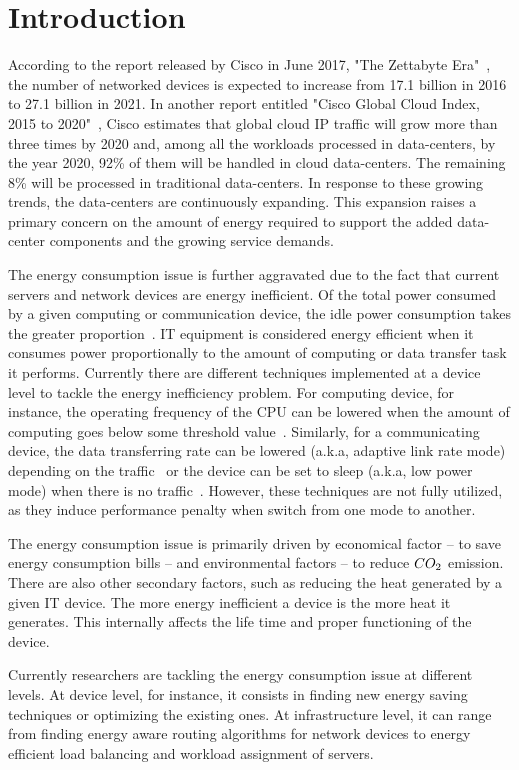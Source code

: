 \section{Introduction}
\label{section:intro}
According to the report released by Cisco in June 2017, "The Zettabyte Era"~\cite{zetta}, the number of networked devices is expected to increase from 17.1 billion in 2016 to 27.1 billion in 2021. In another report entitled "Cisco Global Cloud Index, 2015 to 2020"~\cite{gci}, Cisco estimates that global cloud IP traffic will grow more than three times by 2020 and, among all the workloads processed in data-centers, by the year 2020, 92\% of them will be handled in cloud data-centers. The remaining 8\% will be processed in traditional data-centers. In response to these growing trends, the data-centers are continuously expanding. This expansion raises a primary concern on the amount of energy required to support the added data-center components and the growing service demands. 

The energy consumption issue is further aggravated due to the fact that current servers and network devices are energy inefficient. Of the total power consumed by a given computing or communication device, the idle power consumption takes the greater proportion~\cite{survey}. IT equipment is considered energy efficient when it consumes power proportionally to the amount of computing or data transfer task it performs. Currently there are different techniques implemented at a device level to tackle the energy inefficiency problem. For computing device, for instance, the operating frequency of the CPU can be lowered when the amount of computing goes below some threshold value~\cite{dvs}. Similarly, for a communicating device, the data transferring rate can be lowered (a.k.a, adaptive link rate mode) depending on the traffic~\cite{ALR} or the device can be set to sleep (a.k.a, low power mode) when there is no traffic~\cite{LPI}. However, these techniques are not fully utilized, as they induce performance penalty when switch from one mode to another.  

The energy consumption issue is primarily driven by economical factor -- to save energy consumption bills -- and environmental factors -- to reduce \($$CO_2$$\) emission. There are also other secondary factors, such as reducing the heat generated by a given IT device. The more energy inefficient a device is the more heat it generates. This internally affects the life time and proper functioning of the device. 

Currently researchers are tackling the energy consumption issue at different levels. At device level, for instance, it consists in finding new energy saving techniques or optimizing the existing ones. At infrastructure level, it can range from finding energy aware routing algorithms for network devices to energy efficient load balancing and workload assignment of servers. 

